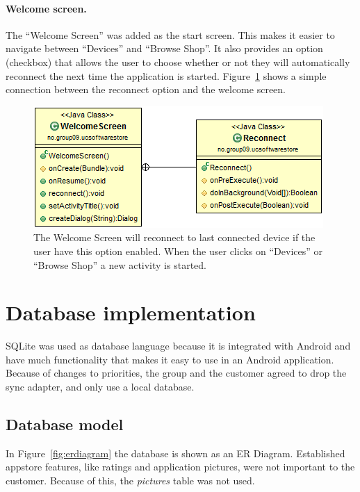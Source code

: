 	\paragraph{Welcome screen.}
	The ``Welcome Screen'' was added as the start screen. This makes it easier to navigate between ``Devices'' and ``Browse Shop''. It also provides an option (checkbox) that allows the user to choose whether or not they will automatically reconnect the next time the application is started. Figure~\ref{fig:welcomescreen} shows a simple connection between the reconnect option and the welcome screen.

	\begin{figure}[H]
	\centering
	\includegraphics[scale=0.85]{images/UML/welcomescreen.png}
	\caption[UML - Welcome Screen]{The Welcome Screen will reconnect to last connected device if the user have this option enabled. When the user clicks on ``Devices'' or ``Browse Shop'' a new activity is started.}
	\label{fig:welcomescreen}
	\end{figure}

\section{Database implementation}

	SQLite was used as database language because it is integrated with Android and have much functionality that makes it easy to use in an Android application. Because of changes to priorities, the group and the customer agreed to drop the sync adapter, and only use a local database.

	\subsection{Database model}

		In Figure~\ref{fig:erdiagram} the database is shown as an ER Diagram. Established appstore features, like ratings and application pictures, were not important to the customer. Because of this, the \textit{pictures} table was not used.

